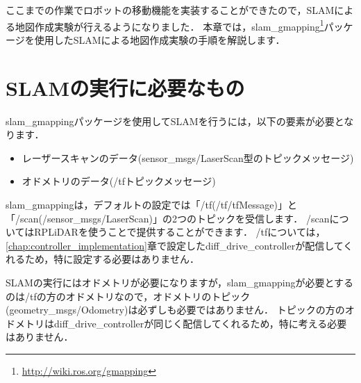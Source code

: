 \documentclass[{../../master}]{subfiles}
\begin{document}
ここまでの作業でロボットの移動機能を実装することができたので，SLAMによる地図作成実験が行えるようになりました．
本章では，\textsf{slam\_gmapping}\footnote{\url{http://wiki.ros.org/gmapping}}パッケージを使用したSLAMによる地図作成実験の手順を解説します．

\section{SLAMの実行に必要なもの}

\textsf{slam\_gmapping}パッケージを使用してSLAMを行うには，以下の要素が必要となります．

\begin{itemize}
  \item レーザースキャンのデータ(\textsf{sensor\_msgs/LaserScan}型のトピックメッセージ)
  \item オドメトリのデータ(\textsf{/tf}トピックメッセージ)
\end{itemize}

\textsf{slam\_gmapping}は，デフォルトの設定では「\textsf{/tf}(\textsf{/tf/tfMessage})」と「\textsf{/scan}(\textsf{/sensor\_msgs/LaserScan})」の2つのトピックを受信します．
\textsf{/scan}についてはRPLiDARを使うことで提供することができます．
\textsf{/tf}については，\ref{chap:controller_implementation}章で設定した\textsf{diff\_drive\_controller}が配信してくれるため，特に設定する必要はありません．

SLAMの実行にはオドメトリが必要になりますが，\textsf{slam\_gmapping}が必要とするのは\textsf{/tf}の方のオドメトリなので，オドメトリのトピック(\textsf{geometry\_msgs/Odometry})は必ずしも必要ではありません．
トピックの方のオドメトリは\textsf{diff\_drive\_controller}が同じく配信してくれるため，特に考える必要はありません．
\end{document}
